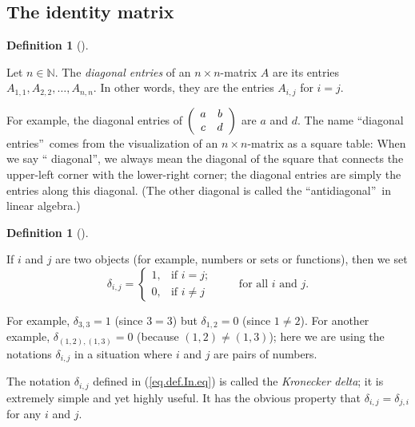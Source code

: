 \documentclass[numbers=enddot,12pt,final,onecolumn,notitlepage]{scrartcl}%
\theoremstyle{definition}
\newtheorem{defi}[theo]{Definition}
\newenvironment{definition}[1][]
{\begin{defi}[#1]\begin{leftbar}}
{\end{leftbar}\end{defi}}
\begin{document}
\subsection{The identity matrix}

\begin{definition}
Let $n\in\mathbb{N}$. The \textit{diagonal entries} of an $n\times n$-matrix
$A$ are its entries $A_{1,1},A_{2,2},\ldots,A_{n,n}$. In other words, they are
the entries $A_{i,j}$ for $i=j$.
\end{definition}

For example, the diagonal entries of $\left(
\begin{array}
[c]{cc}%
a & b\\
c & d
\end{array}
\right)  $ are $a$ and $d$. The name \textquotedblleft diagonal
entries\textquotedblright\ comes from the visualization of an $n\times
n$-matrix as a square table: When we say \textquotedblleft
diagonal\textquotedblright, we always mean the diagonal of the square that
connects the upper-left corner with the lower-right corner; the diagonal
entries are simply the entries along this diagonal. (The other diagonal is
called the \textquotedblleft antidiagonal\textquotedblright\ in linear algebra.)

\begin{definition}
If $i$ and $j$ are two objects (for example, numbers or sets or functions),
then we set%
\begin{equation}
\delta_{i,j}=%
\begin{cases}
1, & \text{if }i=j;\\
0, & \text{if }i\neq j
\end{cases}
\ \ \ \ \ \ \ \ \ \ \text{for all }i\text{ and }j. \label{eq.def.In.eq}%
\end{equation}

\end{definition}

For example, $\delta_{3,3}=1$ (since $3=3$) but $\delta_{1,2}=0$ (since
$1\neq2$). For another example, $\delta_{\left(  1,2\right)  ,\left(
1,3\right)  }=0$ (because $\left(  1,2\right)  \neq\left(  1,3\right)  $);
here we are using the notations $\delta_{i,j}$ in a situation where $i$ and
$j$ are pairs of numbers.

The notation $\delta_{i,j}$ defined in (\ref{eq.def.In.eq}) is called the
\textit{Kronecker delta}; it is extremely simple and yet highly useful. It has
the obvious property that $\delta_{i,j}=\delta_{j,i}$ for any $i$ and $j$.
\end{document}
